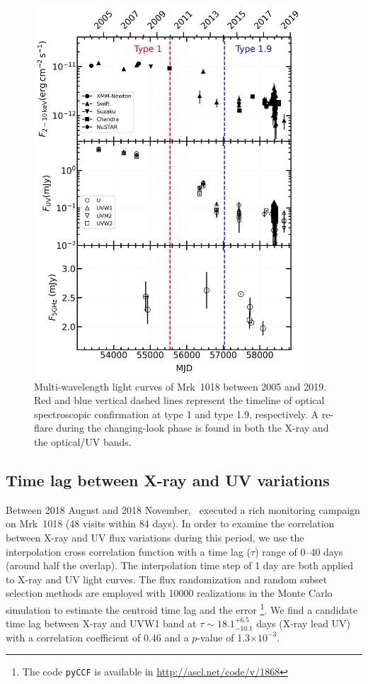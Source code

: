 \begin{figure}
\centering
	\includegraphics[width=0.9\textwidth]{./pic/subplots-xrt_uvot-radio-second.png}
    \caption{Multi-wavelength light curves of Mrk~1018 between 2005 and 2019. Red and blue vertical dashed lines represent the timeline of optical spectroscopic confirmation at type 1 and type 1.9, respectively. A re-flare during the changing-look phase is found in both the X-ray and the optical/UV bands.}
    \label{fig:multi-lc-secondaxis}
\end{figure}

\subsection{Time lag between X-ray and UV variations}
Between 2018 August and 2018 November, \swift\, executed a rich monitoring campaign on Mrk~1018 (48 visits within 84 days). In order to examine the correlation between X-ray and UV flux variations during this period, we use the interpolation cross correlation function \citep[ICCF;][]{1998PASP..110..660P} with a time lag ($\tau$) range of 0--40 days (around half the overlap). The interpolation time step of 1 day are both applied to X-ray and UV light curves. The flux randomization and random subset selection methods are employed with 10000 realizations in the Monte Carlo simulation to estimate the centroid time lag and the error \footnote{The code \texttt{pyCCF} is available in \url{http://ascl.net/code/v/1868}}. We find a candidate time lag between X-ray and UVW1 band at $\tau \sim 18.1 ^{+6.5}_{-10.1} $ days (X-ray lead UV) with a correlation coefficient of 0.46 and a $p$-value of 1.3$\times10^{-3}$.

